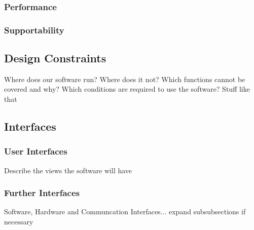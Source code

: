 \subsubsection{Performance}
\label{sec:domainBcc}
\subsubsection{Supportability}
\label{sec:domainBcd}

\subsection{Design Constraints}
\label{sec:domainBd}
Where does our software run? Where does it not? Which functions cannot be covered and why? Which conditions are required to use the software? Stuff like that

\subsection{Interfaces}
\label{sec:domainBe}
\subsubsection{User Interfaces}
\label{sec:domainBea}
Describe the views the software will have
\subsubsection{Further Interfaces}
\label{sec:domainBeb}
Software, Hardware and Communcation Interfaces... expand subsubsections if necessary

\setlength{\parindent}{1.5em}
\setlength{\parskip}{1em}
